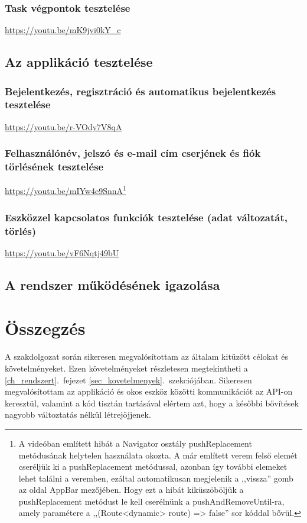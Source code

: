 \documentclass{thesis-ekf}
\theoremstyle{definition}
\theoremstyle{remark}
\begin{document}
	\subsection{Task végpontok tesztelése}
	\url{https://youtu.be/mK9jvi0kY_c}
	\section{Az applikáció tesztelése}
	\subsection{Bejelentkezés, regisztráció és automatikus bejelentkezés tesztelése}
	\url{https://youtu.be/r-VOdy7V8qA}
	\subsection{Felhasználónév, jelszó és e-mail cím cserjének és fiók törlésének tesztelése}
	\url{https://youtu.be/mIYw4e9SnnA}\footnote{
	A videóban említett hibát a Navigator osztály pushReplacement metódusának helytelen használata okozta. A már említett verem felső elemét cseréljük ki a pushReplacement metódussal, azonban így további elemeket lehet találni a veremben, ezáltal automatikusan megjelenik a ,,vissza'' gomb az oldal AppBar mezőjében. Hogy ezt a hibát kiküszöböljük  a pushReplacement metódust le kell cserélnünk a pushAndRemoveUntil-ra, amely paramétere a ,,(Route<dynamic> route) => false'' sor kóddal bővül.}
	\subsection{Eszközzel kapcsolatos funkciók tesztelése (adat változatát, törlés)}
	\url{https://youtu.be/vF6Nqtj49bU}
	\section{A rendszer működésének igazolása}
	\chapter*{Összegzés}
	A szakdolgozat során sikeresen megvalósítottam az általam kitűzött célokat és követelményeket. Ezen követelményeket részletesen megtekintheti a \ref{ch_rendszert}.~fejezet \ref{sec_kovetelmenyek}.~szekciójában. Sikeresen megvalósítottam az applikáció és okos eszköz közötti kommunikációt az API-on keresztül, valamint a kód tisztán tartásával elértem azt, hogy a későbbi bővítések nagyobb változtatás nélkül létrejöjjenek.
\end{document}

